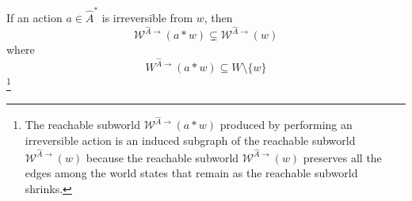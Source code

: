 \begin{propositionE}
\label{prp:reachable_subworld_irreversible_action}
    If an action $a \in \hat{A}^{*}$ is irreversible from $w$, then
    \begin{equation}
        \mathscr{W}^{\hat{A}\to}(a \ast w) \subsetneq \mathscr{W}^{\hat{A}\to}(w)
    \end{equation}
    where
    \begin{equation}
        W^{\hat{A}\to}(a \ast w) \subseteq W \setminus \{w\}
    \end{equation}
    \footnote{
    The reachable subworld $\mathscr{W}^{\hat{A}\to}(a \ast w)$ produced by performing an irreversible action is an induced subgraph of the reachable subworld $\mathscr{W}^{\hat{A}\to}(w)$ because the reachable subworld $\mathscr{W}^{\hat{A}\to}(w)$ preserves all the edges among the world states that remain as the reachable subworld shrinks.
    }
\end{propositionE}
